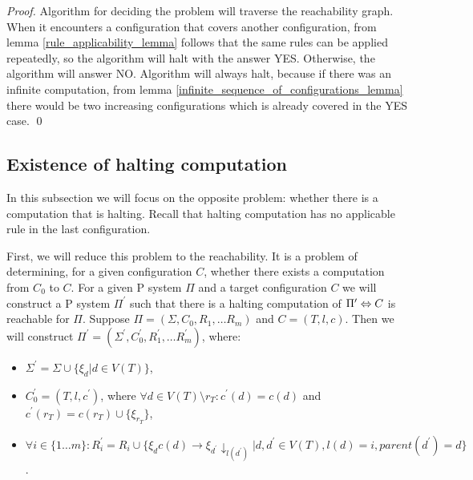 \documentclass[llncs,submission,copyright,creativecommons]{../lib/lncs/llncs}
\begin{document}
\begin{proof}
  Algorithm for deciding the problem will traverse the reachability graph. When it encounters a configuration that covers another configuration, from lemma \ref{rule_applicability_lemma} follows that the same rules can be applied repeatedly, so the algorithm will halt with the answer YES.
  Otherwise, the algorithm will answer NO.
  Algorithm will always halt, because if there was an infinite computation, from lemma \ref{infinite_sequence_of_configurations_lemma} there would be two increasing configurations which is already covered in the YES case.
  \qed
\end{proof}


\subsection{Existence of halting computation} %
\label{sub:existence_of_halting_computation}

In this subsection we will focus on the opposite problem: whether there is a computation that is halting. Recall that halting computation has no applicable rule in the last configuration.

First, we will reduce this problem to the reachability. It is a problem of determining, for a given configuration $C$, whether there exists a computation from $C_0$ to $C$.
For a given P system $\Pi$ and a target configuration $C$ we will construct a P system $\Pi^\prime$ such that there is a halting computation of $\Pi^\prime\Leftrightarrow\linebreak C$ is reachable for $\Pi$. Suppose $\Pi = (\Sigma, C_0, R_1, \dots R_m)$ and $C = (T, l, c)$. Then we will construct $\Pi^\prime = (\Sigma^\prime, C_0^\prime, R_1^\prime, \dots R_m^\prime)$, where:

\begin{itemize}
  \item $\Sigma^\prime = \Sigma\cup\{\xi_d|d\in V(T)\}$,
  \item $C_0^\prime = (T, l, c^\prime)$, where $\forall d\in V(T)\setminus r_T: c^\prime(d) = c(d)$ and $c^\prime(r_T) = c(r_T)\cup\{\xi_{r_T}\}$,
  \item $\forall i\in\{1\dots m\}: R_i^\prime = R_i\cup\{\xi_d c(d)\rightarrow\xi_{d^\prime}\downarrow_{l(d^\prime)}|d,d^\prime\in V(T),l(d)=i,parent(d^\prime)=d\}$.
\end{itemize}
\end{document}
